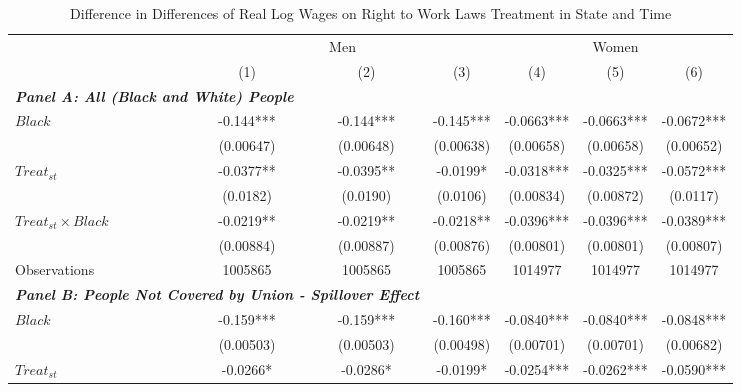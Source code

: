 \begin{table}[ht!]\centering
\def\sym#1{\ifmmode^{#1}\else\(^{#1}\)\fi}
\caption{Difference in Differences of Real Log Wages on Right to Work Laws Treatment in State and Time}\label{tab:wagstagdid}
\fontsize{10}{11}\selectfont
\begin{tabular}{l*{6}{c}}
\hline
&\multicolumn{3}{c}{Men}                        &\multicolumn{3}{c}{Women}                      \\\cmidrule(lr){2-4}\cmidrule(lr){5-7}
&\multicolumn{1}{c}{(1)}   &\multicolumn{1}{c}{(2)}   &\multicolumn{1}{c}{(3)}   &\multicolumn{1}{c}{(4)}   &\multicolumn{1}{c}{(5)}   &\multicolumn{1}{c}{(6)}   \\
\hline
\multicolumn{3}{l}{\linebreak \textbf{\textit{Panel A: All (Black and White) People}}} \\
$ Black $           &      -0.144***&      -0.144***&      -0.145***&     -0.0663***&     -0.0663***&     -0.0672***\\
&   (0.00647)   &   (0.00648)   &   (0.00638)   &   (0.00658)   &   (0.00658)   &   (0.00652)   \\
[1em]
$ Treat_{st} $      &     -0.0377** &     -0.0395** &     -0.0199*  &     -0.0318***&     -0.0325***&     -0.0572***\\
&    (0.0182)   &    (0.0190)   &    (0.0106)   &   (0.00834)   &   (0.00872)   &    (0.0117)   \\
[1em]
$ Treat_{st} \times Black $&     -0.0219** &     -0.0219** &     -0.0218** &     -0.0396***&     -0.0396***&     -0.0389***\\
&   (0.00884)   &   (0.00887)   &   (0.00876)   &   (0.00801)   &   (0.00801)   &   (0.00807)   \\
\hline
Observations        &     1005865   &     1005865   &     1005865   &     1014977   &     1014977   &     1014977   \\
\hline
\multicolumn{3}{l}{\linebreak \textbf{\textit{Panel B: People Not Covered by Union - Spillover Effect}}} \\
$ Black $           &      -0.159***&      -0.159***&      -0.160***&     -0.0840***&     -0.0840***&     -0.0848***\\
&   (0.00503)   &   (0.00503)   &   (0.00498)   &   (0.00701)   &   (0.00701)   &   (0.00682)   \\
[1em]
$ Treat_{st} $      &     -0.0266*  &     -0.0286*  &     -0.0199*  &     -0.0254***&     -0.0262***&     -0.0590***\\

\end{tabular}
\end{table}
